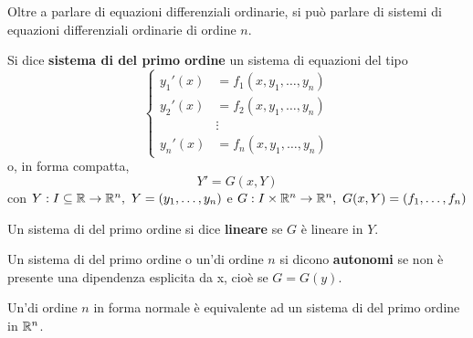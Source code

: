 Oltre a parlare di equazioni differenziali ordinarie, si può parlare di sistemi di equazioni differenziali ordinarie di ordine $n$.
\begin{definition} \label{Def: Sistema di ode del primo ordine}
    Si dice \textbf{sistema di \odes del primo ordine} un sistema di equazioni del tipo
    \begin{equation}
        \left\{
        \begin{aligned}
        y_1'(x) &= f_1(x, y_1, \dots, y_n)\\
         y_2'(x) &= f_2(x, y_1, \dots, y_n)\\       
        &\vdots \\
        y_n'(x) &= f_n(x, y_1, \dots, y_n)
        \end{aligned} \right.
\end{equation}
o, in forma compatta, 
\begin{equation}
    Y'=G(x, Y)
\end{equation}
con $Y: I \subseteq \mathbb{R} \to \mathbb{R}^n,\ Y=(y_1, \dots, y_n)$ e $G:I \times \mathbb{R}^n \to \mathbb{R}^n,\ G(x, Y)=(f_1, \dots, f_n)$
\end{definition}
\begin{definition} \label{Def: Sistema di ode lineare}
    Un sistema di \odes del primo ordine si dice \textbf{lineare} se $G$ è lineare in $Y$.
\end{definition}
\begin{definition} \label{Def: Sistema/Ode autonoma}
    Un sistema di \odes del primo ordine o un'\ode di ordine $n$ si dicono \textbf{autonomi} se non è presente una dipendenza esplicita da x, cioè se $G=G(y)$.
\end{definition}
\begin{lemma} \label{Lemma: Equivalenza equazione-sistema}
    Un'\ode di ordine $n$ in forma normale è equivalente ad un sistema di \odes del primo ordine in $\mathbb{R}^n$.
\end{lemma}
